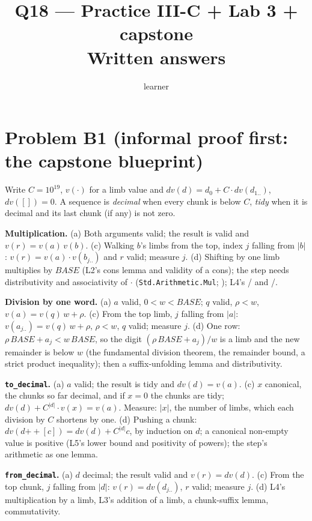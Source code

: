 \documentclass[11pt]{article}
\title{Q18 --- Practice III-C + Lab 3 + capstone \\ \large Written answers}
\author{learner}
\date{}
\begin{document}
\maketitle
\sloppy

\section*{Problem B1 (informal proof first: the capstone blueprint)}\label{ans:B1}
\begin{answer}
Write $C = 10^{19}$, $v(\cdot)$ for a limb value and
$\mathit{dv}(d) = d_0 + C\cdot\mathit{dv}(d_{1..})$, $\mathit{dv}([]) = 0$.
A sequence is \emph{decimal} when every chunk is below $C$, \emph{tidy} when
it is decimal and its last chunk (if any) is not zero.

\textbf{Multiplication.}
(a) Both arguments valid; the result is valid and $v(r) = v(a)\,v(b)$.
(c) Walking $b$'s limbs from the top, index $j$ falling from $|b|$:
$v(r) = v(a)\cdot v(b_{j..})$ and $r$ valid; measure $j$.
(d) Shifting by one limb multiplies by $\mathit{BASE}$ (L2's cons lemma and
validity of a cons); the step needs distributivity and associativity of
$\cdot$ (\texttt{Std.Arithmetic.Mul}; ); L4's
/ and /.

\textbf{Division by one word.}
(a) $a$ valid, $0 < w < \mathit{BASE}$; $q$ valid, $\rho < w$,
$v(a) = v(q)\,w + \rho$.
(c) From the top limb, $j$ falling from $|a|$: $v(a_{j..}) = v(q)\,w + \rho$,
$\rho < w$, $q$ valid; measure $j$.
(d) One row: $\rho\,\mathit{BASE} + a_j < w\,\mathit{BASE}$, so the digit
$(\rho\,\mathit{BASE}+a_j)/w$ is a limb and the new remainder is below $w$
(the fundamental division theorem, the remainder bound, a strict product
inequality); then a suffix-unfolding lemma and distributivity.

\textbf{\texttt{to\_decimal}.}
(a) $a$ valid; the result is tidy and $\mathit{dv}(d) = v(a)$.
(c) $x$ canonical, the chunks so far decimal, and if $x = 0$ the chunks are
tidy; $\mathit{dv}(d) + C^{|d|}\cdot v(x) = v(a)$. Measure: $|x|$, the
number of limbs, which each division by $C$ shortens by one.
(d) Pushing a chunk: $\mathit{dv}(d \mathbin{+\!\!+} [c]) = \mathit{dv}(d) +
C^{|d|} c$, by induction on $d$; a canonical non-empty value is positive
(L5's lower bound and positivity of powers); the step's arithmetic as one
lemma.

\textbf{\texttt{from\_decimal}.}
(a) $d$ decimal; the result valid and $v(r) = \mathit{dv}(d)$.
(c) From the top chunk, $j$ falling from $|d|$: $v(r) = \mathit{dv}(d_{j..})$,
$r$ valid; measure $j$.
(d) L4's multiplication by a limb, L3's addition of a limb, a chunk-suffix
lemma, commutativity.


\end{answer}
\end{document}
